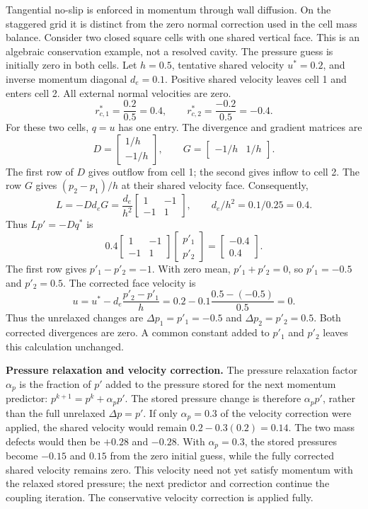 Tangential no-slip is enforced in momentum through wall diffusion. On the staggered grid it is distinct from the zero normal correction used in the cell mass balance.
\newpage
{}
Consider two closed square cells with one shared vertical face. This is an algebraic conservation example, not a resolved cavity. The pressure guess is initially zero in both cells. Let $h=0.5$, tentative shared velocity $u^*=0.2$, and inverse momentum diagonal $d_e=0.1$. Positive shared velocity leaves cell 1 and enters cell 2. All external normal velocities are zero.
\[
r_{c,1}^*=\frac{0.2}{0.5}=0.4,\qquad
r_{c,2}^*=\frac{-0.2}{0.5}=-0.4.
\]
For these two cells, $q=u$ has one entry. The divergence and gradient matrices are
\[
D=\begin{bmatrix}1/h\\-1/h\end{bmatrix},\qquad
G=\begin{bmatrix}-1/h&1/h\end{bmatrix}.
\]
The first row of $D$ gives outflow from cell 1; the second gives inflow to cell 2.
The row $G$ gives $(p_2-p_1)/h$ at their shared velocity face. Consequently,
\[
L=-D d_e G=\frac{d_e}{h^2}\begin{bmatrix}1&-1\\-1&1\end{bmatrix},
\qquad d_e/h^2=0.1/0.25=0.4.
\]
Thus $Lp'=-Dq^*$ is
\[
0.4\begin{bmatrix}1&-1\\-1&1\end{bmatrix}
\begin{bmatrix}p'_1\\p'_2\end{bmatrix}
=\begin{bmatrix}-0.4\\0.4\end{bmatrix}.
\]
The first row gives $p'_1-p'_2=-1$. With zero mean, $p'_1+p'_2=0$, so $p'_1=-0.5$ and $p'_2=0.5$. The corrected face velocity is
\[
u=u^*-d_e\frac{p'_2-p'_1}{h}
=0.2-0.1\frac{0.5-(-0.5)}{0.5}=0.
\]
Thus the unrelaxed changes are $\Delta p_1=p'_1=-0.5$ and $\Delta p_2=p'_2=0.5$. Both corrected divergences are zero. A common constant added to $p'_1$ and $p'_2$ leaves this calculation unchanged.

\textbf{Pressure relaxation and velocity correction.} The pressure relaxation factor $\alpha_p$ is the fraction of $p'$ added to the pressure stored for the next momentum predictor: $p^{k+1}=p^k+\alpha_p p'$. The stored pressure change is therefore $\alpha_p p'$, rather than the full unrelaxed $\Delta p=p'$. If only $\alpha_p=0.3$ of the velocity correction were applied, the shared velocity would remain $0.2-0.3(0.2)=0.14$. The two mass defects would then be $+0.28$ and $-0.28$. With $\alpha_p=0.3$, the stored pressures become $-0.15$ and $0.15$ from the zero initial guess, while the fully corrected shared velocity remains zero. This velocity need not yet satisfy momentum with the relaxed stored pressure; the next predictor and correction continue the coupling iteration. The conservative velocity correction is applied fully.


